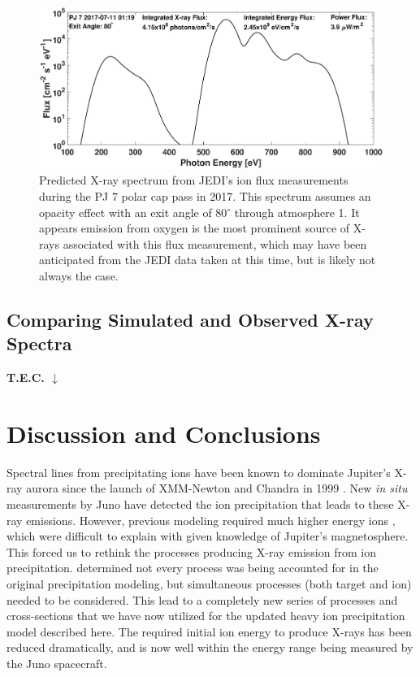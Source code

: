 \documentclass[draft]{agujournal2018}
\begin{document}
\begin{figure}[ht]
    \centering
    \includegraphics[width=\textwidth]{Figures/PJ7Spectrum.eps}
    \caption{Predicted X-ray spectrum from JEDI's ion flux measurements during the PJ 7 polar cap pass in 2017. This spectrum assumes an opacity effect with an exit angle of 80$^{\circ}$ through atmosphere 1. It appears emission from oxygen is the most prominent source of X-rays associated with this flux measurement, which may have been anticipated from the JEDI data taken at this time, but is likely  not always the case.}
    \label{fig:JEDISpec}
\end{figure}

\subsection{Comparing Simulated and Observed X-ray Spectra}



\noindent\textbf{\Large T.E.C. $\downarrow$}

\section{Discussion and Conclusions}

Spectral lines from precipitating ions have been known to dominate Jupiter's X-ray aurora since the launch of XMM-Newton and Chandra in 1999 \citep{branduardi2004,elsner2005}.
New \textit{in situ} measurements by Juno have detected the ion precipitation that leads to these X-ray emissions.
However, previous modeling required much higher energy ions \citep{cravens1995,ozak2010,ozak2013,houston2018}, which were difficult to explain with given knowledge of Jupiter's magnetosphere.
This forced us to rethink the processes producing X-ray emission from ion precipitation.
\citet{schultz2019} determined not every process was being accounted for in the original precipitation modeling, but simultaneous processes (both target and ion) needed to be considered.
This lead to a completely new series of processes and cross-sections that we have now utilized for the updated heavy ion precipitation model described here.
The required initial ion energy to produce X-rays has been reduced dramatically, and is now well within the energy range being measured by the Juno spacecraft.
\end{document}
